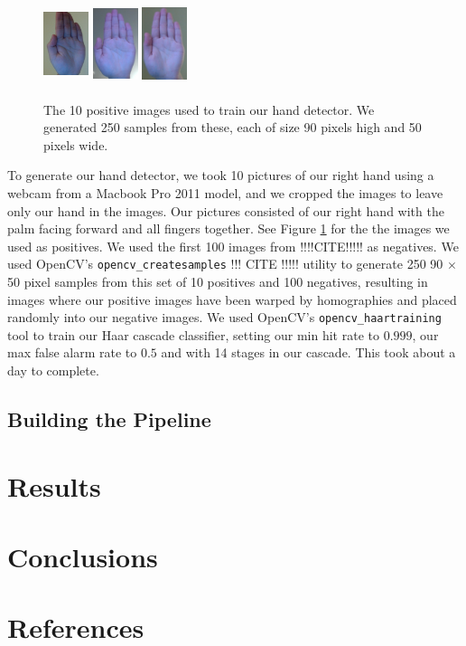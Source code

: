 \documentclass[12pt]{article}
\begin{document}
\begin{figure}[H]
\includegraphics[width=50px, height=90px]{../data/positives/img0007.jpg}
\includegraphics[width=50px, height=90px]{../data/positives/img0008.jpg}
\includegraphics[width=50px, height=90px]{../data/positives/img0009.jpg}
\caption{The 10 positive images used to train our hand detector. We generated 250 samples from these, each of size 90 pixels high and 50 pixels wide.}
\label{traininghands}
\end{figure}

To generate our hand detector, we took 10 pictures of our right hand using a webcam from a  Macbook Pro 2011 model, and we cropped the images to leave only our hand in the images. Our pictures consisted of our right hand with the palm facing forward and all fingers together. See Figure \ref{traininghands} for the the images we used as positives. We used the first 100 images from !!!!CITE!!!!! as negatives. We used OpenCV's \texttt{opencv\_createsamples} !!! CITE !!!!! utility to generate 250 90 $\times$ 50 pixel samples from this set of 10 positives and 100 negatives, resulting in images where our positive images have been warped by homographies and placed randomly into our negative images. We used OpenCV's \texttt{opencv\_haartraining} tool to train our Haar cascade classifier, setting our min hit rate to $0.999$, our max false alarm rate to $0.5$ and with 14 stages in our cascade. This took about a day to complete.

\subsection{Building the Pipeline}

\section{Results}

\section{Conclusions}

\section{References}
\end{document}
